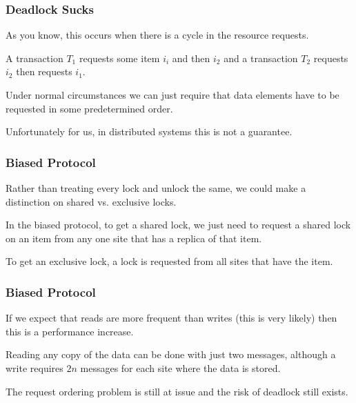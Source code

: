 \begin{frame}
\frametitle{Deadlock Sucks}

As you know, this occurs when there is a cycle in the resource requests. 

A transaction $T_{1}$ requests some item $i_{i}$ and then $i_{2}$ and a transaction $T_{2}$ requests $i_{2}$ then requests $i_{1}$. 

Under normal circumstances we can just require that data elements have to be requested in some predetermined order.

Unfortunately for us, in distributed systems this is not a guarantee.

\end{frame}


\begin{frame}
\frametitle{Biased Protocol}

Rather than treating every lock and unlock the same, we could make a distinction on shared vs. exclusive locks. 

In the biased protocol, to get a shared lock, we just need to request a shared lock on an item from any one site that has a replica of that item. 

To get an exclusive lock, a lock is requested from all sites that have the item.

\end{frame}


\begin{frame}
\frametitle{Biased Protocol}

If we expect that reads are more frequent than writes (this is very likely) then this is a performance increase. 

Reading any copy of the data can be done with just two messages, although a write requires $2n$ messages for each site where the data is stored. 

The request ordering problem is still at issue and the risk of deadlock still exists.

\end{frame}



